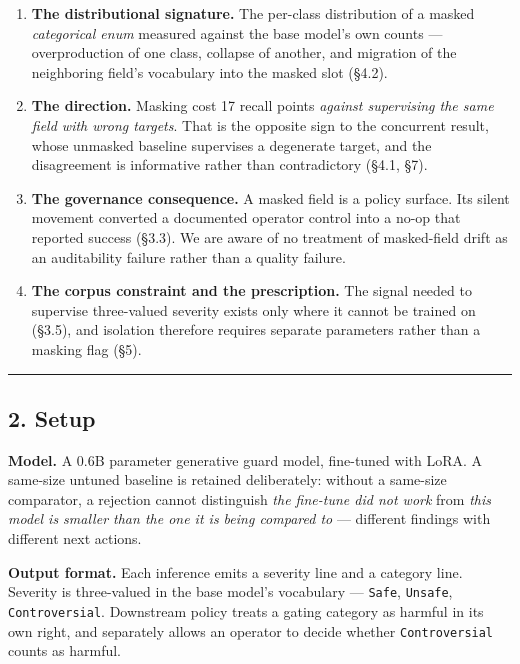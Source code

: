 \begin{enumerate}
\def\labelenumi{\arabic{enumi}.}
\tightlist
\item
  \textbf{The distributional signature.} The per-class distribution of a masked \emph{categorical enum}
  measured against the base model's own counts --- overproduction of one class, collapse of another,
  and migration of the neighboring field's vocabulary into the masked slot (§4.2).
\item
  \textbf{The direction.} Masking cost 17 recall points \emph{against supervising the same field with wrong
  targets}. That is the opposite sign to the concurrent result, whose unmasked baseline supervises a
  degenerate target, and the disagreement is informative rather than contradictory (§4.1, §7).
\item
  \textbf{The governance consequence.} A masked field is a policy surface. Its silent movement converted
  a documented operator control into a no-op that reported success (§3.3). We are aware of no
  treatment of masked-field drift as an auditability failure rather than a quality failure.
\item
  \textbf{The corpus constraint and the prescription.} The signal needed to supervise three-valued
  severity exists only where it cannot be trained on (§3.5), and isolation therefore requires
  separate parameters rather than a masking flag (§5).
\end{enumerate}

\begin{center}\rule{0.5\linewidth}{0.5pt}\end{center}

\subsection{2. Setup}\label{setup}

\textbf{Model.} A 0.6B parameter generative guard model, fine-tuned with LoRA. A same-size untuned
baseline is retained deliberately: without a same-size comparator, a rejection cannot distinguish
\emph{the fine-tune did not work} from \emph{this model is smaller than the one it is being compared to} ---
different findings with different next actions.

\textbf{Output format.} Each inference emits a severity line and a category line. Severity is three-valued
in the base model's vocabulary --- \texttt{Safe}, \texttt{Unsafe}, \texttt{Controversial}. Downstream policy treats a gating
category as harmful in its own right, and separately allows an operator to decide whether
\texttt{Controversial} counts as harmful.

